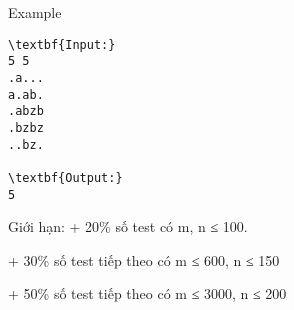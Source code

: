 Example
\begin{verbatim}
\textbf{Input:}
5 5
.a...
a.ab.
.abzb
.bzbz
..bz.

\textbf{Output:}
5
\end{verbatim}
Giới hạn:
+ 20\% số test có m, n ≤ 100.

+ 30\% số test tiếp theo có m ≤ 600, n ≤ 150

+ 50\% số test tiếp theo có m ≤ 3000, n ≤ 200 \textbf{}